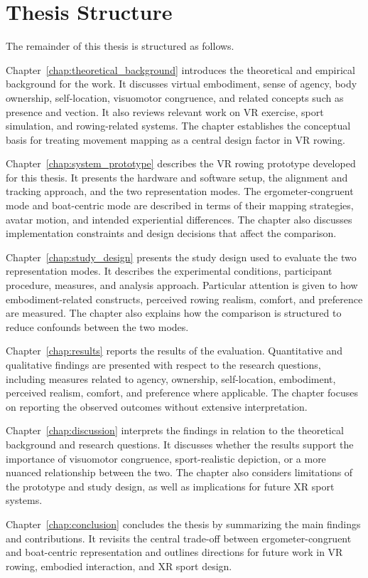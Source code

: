 \section{Thesis Structure}
\label{sec:introduction_thesis_structure}

The remainder of this thesis is structured as follows.

Chapter~\ref{chap:theoretical_background} introduces the theoretical and empirical background for the work. It discusses virtual embodiment, sense of agency, body ownership, self-location, visuomotor congruence, and related concepts such as presence and vection. It also reviews relevant work on VR exercise, sport simulation, and rowing-related systems. The chapter establishes the conceptual basis for treating movement mapping as a central design factor in VR rowing.

Chapter~\ref{chap:system_prototype} describes the VR rowing prototype developed for this thesis. It presents the hardware and software setup, the alignment and tracking approach, and the two representation modes. The ergometer-congruent mode and boat-centric mode are described in terms of their mapping strategies, avatar motion, and intended experiential differences. The chapter also discusses implementation constraints and design decisions that affect the comparison.

Chapter~\ref{chap:study_design} presents the study design used to evaluate the two representation modes. It describes the experimental conditions, participant procedure, measures, and analysis approach. Particular attention is given to how embodiment-related constructs, perceived rowing realism, comfort, and preference are measured. The chapter also explains how the comparison is structured to reduce confounds between the two modes.

Chapter~\ref{chap:results} reports the results of the evaluation. Quantitative and qualitative findings are presented with respect to the research questions, including measures related to agency, ownership, self-location, embodiment, perceived realism, comfort, and preference where applicable. The chapter focuses on reporting the observed outcomes without extensive interpretation.

Chapter~\ref{chap:discussion} interprets the findings in relation to the theoretical background and research questions. It discusses whether the results support the importance of visuomotor congruence, sport-realistic depiction, or a more nuanced relationship between the two. The chapter also considers limitations of the prototype and study design, as well as implications for future XR sport systems.

Chapter~\ref{chap:conclusion} concludes the thesis by summarizing the main findings and contributions. It revisits the central trade-off between ergometer-congruent and boat-centric representation and outlines directions for future work in VR rowing, embodied interaction, and XR sport design.
